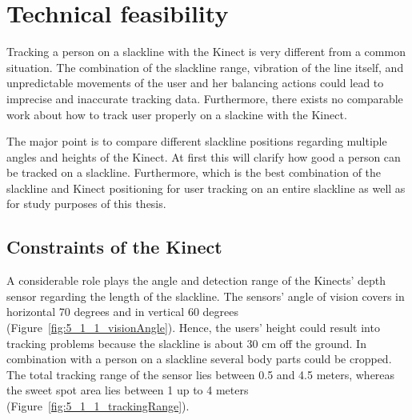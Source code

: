 \section{Technical feasibility}\label{5_1_technicalFeasibility}
Tracking a person on a slackline with the Kinect is very different from a common situation.
The combination of the slackline range, vibration of the line itself, and unpredictable movements of the user and her balancing actions could lead to imprecise and inaccurate tracking data.
Furthermore, there exists no comparable work about how to track user properly on a slackine with the Kinect.

The major point is to compare different slackline positions regarding multiple angles and heights of the Kinect. At first this will clarify how good a person can be tracked on a slackline. Furthermore, which is the best combination of the slackline and Kinect positioning for user tracking on an entire slackline as well as for study purposes of this thesis.

\subsection{Constraints of the Kinect} 
A considerable role plays the angle and detection range of the Kinects' depth sensor regarding the length of the slackline. The sensors’ angle of vision covers in horizontal 70 degrees and in vertical 60 degrees (Figure~\ref{fig:5_1_1_visionAngle}). Hence, the users' height could result into tracking problems because the slackline is about 30 cm off the ground. In combination with a person on a slackline several body parts could be cropped. The total tracking range of the sensor lies between 0.5 and 4.5 meters, whereas the sweet spot area lies between 1 up to 4 meters~\cite{MicrosoftHIG2014-mh} (Figure~\ref{fig:5_1_1_trackingRange}). 


